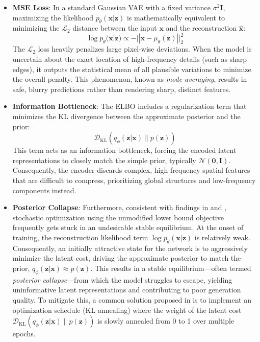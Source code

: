 \begin{itemize}
    \item \textbf{MSE Loss}: In a standard Gaussian VAE with a fixed variance $\sigma^2 \mathbf{I}$, maximizing the likelihood $p_\theta(\mathbf{x}|\mathbf{z})$ is mathematically equivalent to 
    minimizing the $\mathcal{L}_2$ distance between the input $\mathbf{x}$ and the reconstruction $\hat{\mathbf{x}}$:
    \begin{equation}
        \log p_\theta(\mathbf{x}|\mathbf{z}) \propto -||\mathbf{x} - \mu_\theta(\mathbf{z})||^2_2
        \label{eq:vae_mse}
    \end{equation}
    The $\mathcal{L}_2$ loss heavily penalizes large pixel-wise deviations. When the model is uncertain about the exact location of high-frequency details (such as sharp edges), it outputs the statistical 
    mean of all plausible variations to minimize the overall penalty. This phenomenon, known as \textit{mode averaging}, results in safe, blurry predictions rather than rendering sharp, distinct features.
    \item \textbf{Information Bottleneck}: The ELBO includes a regularization term that minimizes the KL divergence between the approximate posterior and the prior:
    \begin{equation}
        \mathcal{D}_{\text{KL}}(q_\phi(\mathbf{z}|\mathbf{x}) \parallel p(\mathbf{z}))
        \label{eq:vae_kl}
    \end{equation}
    This term acts as an information bottleneck, forcing the encoded latent representations to closely match the simple prior, typically $\mathcal{N}(\mathbf{0}, \mathbf{I})$. Consequently, the encoder 
    discards complex, high-frequency spatial features that are difficult to compress, prioritizing global structures and low-frequency components instead.
    \item \textbf{Posterior Collapse}: Furthermore, consistent with findings in \cite{bowman2016generatingsentencescontinuousspace} and \cite{sonderby2016howtrain}, stochastic optimization using the unmodified lower bound objective frequently 
    gets stuck in an undesirable stable equilibrium. At the onset of training, the reconstruction likelihood term $\log p_\theta(\mathbf{x}|\mathbf{z})$ is relatively weak. Consequently, an initially 
    attractive state for the network is to aggressively minimize the latent cost, driving the approximate posterior to match the prior, $q_\phi(\mathbf{z}|\mathbf{x}) \approx p(\mathbf{z})$. This results 
    in a stable equilibrium---often termed \textit{posterior collapse}---from which the model struggles to escape, yielding uninformative latent representations and contributing to poor generation quality. 
    To mitigate this, a common solution proposed in \cite{bowman2016generatingsentencescontinuousspace, sonderby2016howtrain} is to implement an optimization schedule (KL annealing) where the weight of the latent cost 
    $\mathcal{D}_{\text{KL}}(q_\phi(\mathbf{z}|\mathbf{x}) \parallel p(\mathbf{z}))$ is slowly annealed from 0 to 1 over multiple epochs.
\end{itemize}


